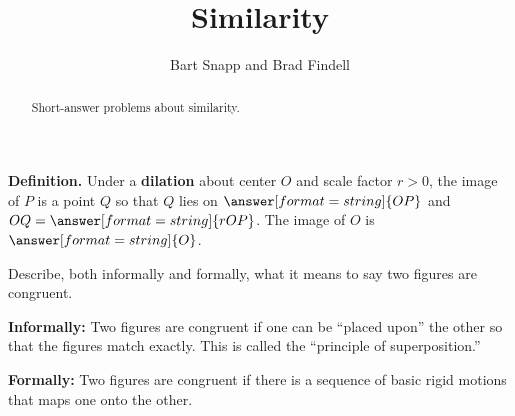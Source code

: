 \documentclass[nooutcomes]{ximera}
\title{Similarity}
\author{Bart Snapp and Brad Findell}
\begin{document}
\begin{abstract}
Short-answer problems about similarity. 
\end{abstract}
\maketitle




%
%
%
%

\begin{question}
\textbf{Definition.} Under a \textbf{dilation} about center $O$ and scale factor $r>0$, the image of $P$ is 
a point $Q$ so that $Q$ lies on  
$\answer[format=string]{OP}$ %
and $OQ=\answer[format=string]{rOP}$.  The image of $O$ is $\answer[format=string]{O}$. 
\end{question}


\begin{question}
Describe, both informally and formally, what it means to say two figures are congruent.
\begin{freeResponse}
\end{freeResponse}
\begin{hint}
\textbf{Informally:}  Two figures are congruent if one can be ``placed upon'' the other so that the figures match exactly.  This is called the ``principle of superposition.''  

\textbf{Formally:}  Two figures are congruent if there is a sequence of basic rigid motions that maps one onto the other.  
\end{hint}
\end{question}
\end{document}
